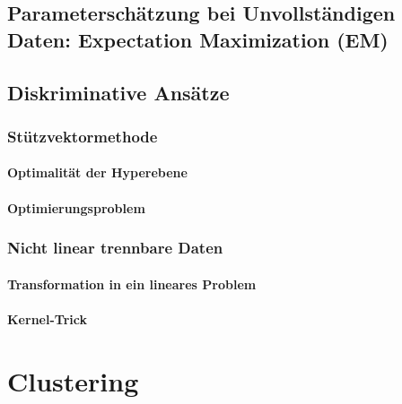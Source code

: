	\section{Parameterschätzung bei Unvollständigen Daten: Expectation Maximization (EM)} %

	\section{Diskriminative Ansätze} %

		\subsection{Stützvektormethode} %

			\subsubsection{Optimalität der Hyperebene} %

			\subsubsection{Optimierungsproblem} %

		\subsection{Nicht linear trennbare Daten} %

			\subsubsection{Transformation in ein lineares Problem} %

			\subsubsection{Kernel-Trick} %

\chapter{Clustering} %

